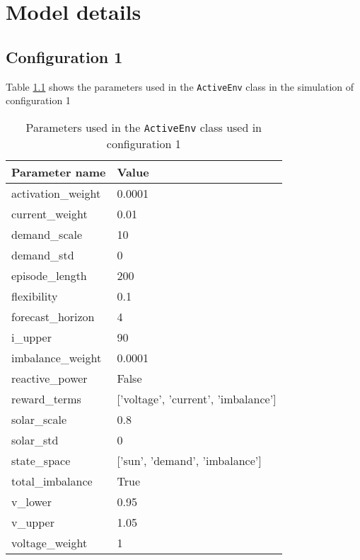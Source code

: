 \documentclass[class=book, crop=false, 11pt]{standalone}
\begin{document}
\chapter{Model details}
\section{Configuration 1}\label{section:apendix_config1}
Table \ref{apendix:config1:params} shows the parameters used in the \texttt{ActiveEnv} class in the simulation of configuration 1

\begin{table}[ht]
\center
\caption{Parameters used in the \texttt{ActiveEnv} class used in configuration 1}
\begin{tabular}{ll}
Parameter name     & Value                                     \\
\hline
activation\_weight & 0.0001                                    \\
current\_weight    & 0.01                                      \\
demand\_scale      & 10                                        \\
demand\_std        & 0                                         \\
episode\_length    & 200                                       \\
flexibility        & 0.1                                       \\
forecast\_horizon  & 4                                         \\
i\_upper           & 90                                        \\
imbalance\_weight  & 0.0001                                    \\
reactive\_power    & False                                     \\
reward\_terms      & {[}'voltage',  'current',  'imbalance'{]} \\
solar\_scale       & 0.8                                       \\
solar\_std         & 0                                         \\
state\_space       & {[}'sun', 'demand',  'imbalance'{]}       \\
total\_imbalance   & True                                      \\
v\_lower           & 0.95                                      \\
v\_upper           & 1.05                                      \\
voltage\_weight    & 1                                         \\
\hline
\end{tabular}
\label{apendix:config1:params}
\end{table}
\end{document}
